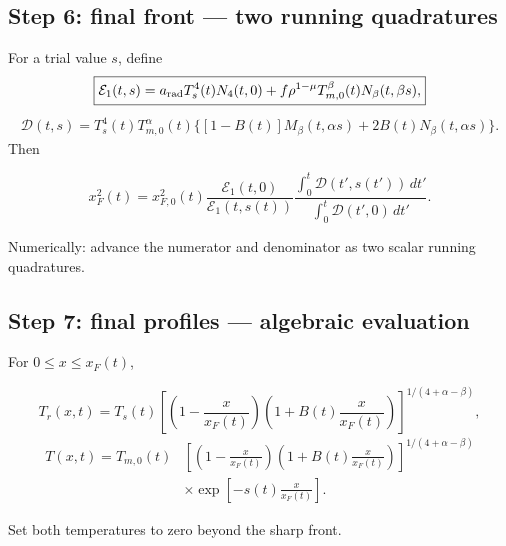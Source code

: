 \documentclass[11pt]{article}
\numberwithin{equation}{section}
\newcommand{\Ts}{T_s}
\newcommand{\Tr}{T_r}
\newcommand{\Tm}{T_{m,0}}
\newcommand{\xf}{x_F}
\newcommand{\xfzero}{x_{F,0}}
\newcommand{\arad}{a_{\rm rad}}
\newcommand{\dif}{\,d}
\newcommand{\calE}{\mathcal{E}}
\newcommand{\calD}{\mathcal{D}}
\begin{document}
\subsection*{Step 6: final front --- two running quadratures}

For a trial value $s$, define
\begin{equation}
 \boxed{
 \calE_1(t,s)=\arad\Ts^4(t)N_4(t,0)
 +f\rho^{1-\mu}\Tm^\beta(t)N_\beta(t,\beta s),}
 \label{eq:sum_E1}
\end{equation}
\begin{equation}
 \boxed{
 \begin{aligned}
 \calD(t,s)=\Ts^4(t)\Tm^\alpha(t)
 \Big\{[1-B(t)]M_\beta(t,\alpha s)
 +2B(t)N_\beta(t,\alpha s)\Big\}.
 \end{aligned}}
 \label{eq:sum_D}
\end{equation}
Then
\begin{resultbox}
\begin{equation}
 \boxed{
 \xf^2(t)=\xfzero^2(t)
 \frac{\calE_1(t,0)}{\calE_1(t,s(t))}
 \frac{\displaystyle\int_0^t\calD(t',s(t'))\dif t'}
 {\displaystyle\int_0^t\calD(t',0)\dif t'}.}
 \label{eq:sum_xf}
\end{equation}
\end{resultbox}
Numerically: advance the numerator and denominator as two scalar running
quadratures.

\subsection*{Step 7: final profiles --- algebraic evaluation}

For $0\le x\le\xf(t)$,
\begin{resultbox}
\begin{equation}
 \boxed{
 \Tr(x,t)=\Ts(t)
 \left[
 \left(1-\frac{x}{\xf(t)}\right)
 \left(1+B(t)\frac{x}{\xf(t)}\right)
 \right]^{1/(4+\alpha-\beta)},}
 \label{eq:sum_Tr_profile}
\end{equation}
\begin{equation}
 \boxed{
 \begin{aligned}
 T(x,t)=\Tm(t)
 &\left[
 \left(1-\frac{x}{\xf(t)}\right)
 \left(1+B(t)\frac{x}{\xf(t)}\right)
 \right]^{1/(4+\alpha-\beta)}
 \\
 &\times\exp\left[-s(t)\frac{x}{\xf(t)}\right].
 \end{aligned}}
 \label{eq:sum_T_profile}
\end{equation}
\end{resultbox}
Set both temperatures to zero beyond the sharp front.
\end{document}
